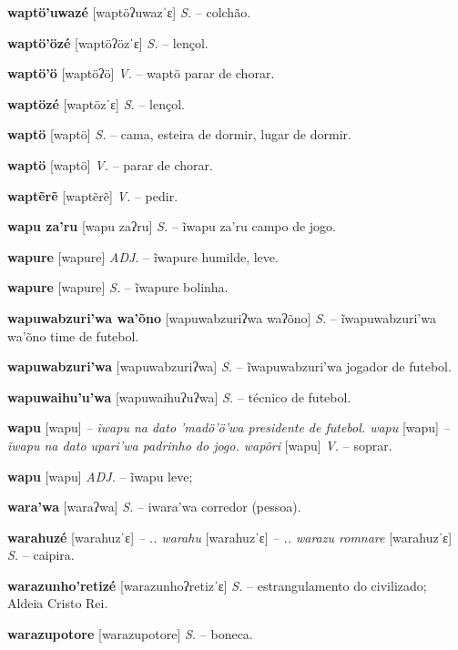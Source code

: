 \textbf{waptö'uwazé} [waptöʔuwazˈɛ] \textit{S.} -- colchão.

\textbf{waptö'özé} [waptöʔözˈɛ] \textit{S.} -- lençol.

\textbf{waptö'ö} [waptöʔö] \textit{V.} -- waptö parar de chorar.

\textbf{waptözé} [waptözˈɛ] \textit{S.} -- lençol.

\textbf{waptö} [waptö] \textit{S.} -- cama, esteira de dormir, lugar de dormir.

\textbf{waptö} [waptö] \textit{V.} -- parar de chorar.

\textbf{waptẽrẽ} [waptẽrẽ] \textit{V.} -- pedir.

\textbf{wapu za'ru} [wapu zaʔru] \textit{S.} -- ĩwapu za'ru campo de jogo.

\textbf{wapure} [wapure] \textit{ADJ.} -- ĩwapure humilde, leve.

\textbf{wapure} [wapure] \textit{S.} -- ĩwapure bolinha.

\textbf{wapuwabzuri'wa wa'õno} [wapuwabzuriʔwa waʔõno] \textit{S.} -- ĩwapuwabzuri'wa wa'õno time de futebol.

\textbf{wapuwabzuri'wa} [wapuwabzuriʔwa] \textit{S.} -- ĩwapuwabzuri'wa jogador de futebol.

\textbf{wapuwaihu'u'wa} [wapuwaihuʔuʔwa] \textit{S.} -- técnico de futebol.

\textbf{wapu} [wapu] \textit{-- ĩwapu na dato 'madö'ö'wa presidente de futebol. wapu} [wapu] \textit{-- ĩwapu na dato upari'wa padrinho do jogo. wapõri} [wapu] \textit{V.} -- soprar.

\textbf{wapu} [wapu] \textit{ADJ.} -- ĩwapu leve;

\textbf{wara'wa} [waraʔwa] \textit{S.} -- iwara'wa corredor (pessoa).

\textbf{warahuzé} [warahuzˈɛ] \textit{-- .. warahu} [warahuzˈɛ] \textit{-- .. warazu romnare} [warahuzˈɛ] \textit{S.} -- caipira.

\textbf{warazunho'retizé} [warazunhoʔretizˈɛ] \textit{S.} -- estrangulamento do civilizado; Aldeia Cristo Rei.

\textbf{warazupotore} [warazupotore] \textit{S.} -- boneca.

